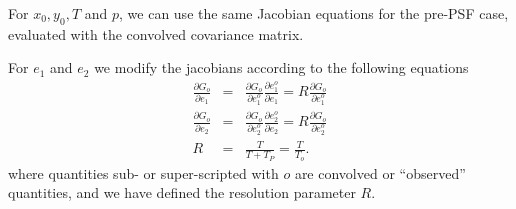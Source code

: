 \documentclass[12pt,preprint]{aastex}
\begin{document}
For $x_0,y_0,T$ and $p$, we can use the same Jacobian equations for the pre-PSF
case, evaluated with the convolved covariance matrix. 

For $e_1$ and $e_2$ we modify the jacobians according to the following equations
\begin{eqnarray}
\frac{\partial G_o}{\partial e_1} 
 & = & \frac{\partial G_o}{\partial e_1^o} \frac{\partial e_1^o}{\partial e_1} 
    =  R \frac{\partial G_o}{\partial e_1^o}\\
\frac{\partial G_o}{\partial e_2} 
 & = & \frac{\partial G_o}{\partial e_2^o} \frac{\partial e_2^o}{\partial e_2}
    =  R \frac{\partial G_o}{\partial e_2^o}\\
R & = & \frac{T}{T + T_P} = \frac{T}{T_o}.
\end{eqnarray}
where quantities sub- or super-scripted with $o$ are convolved or ``observed''
quantities, and we have defined the resolution parameter $R$.
\end{document}
